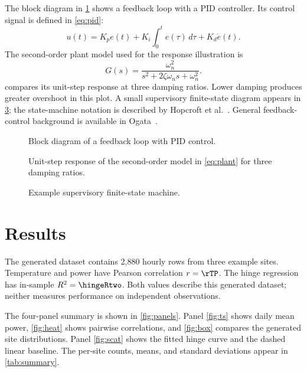 \documentclass[journal]{IEEEtran}
\begin{document}
The block diagram in \cref{fig:loop} shows a feedback loop with a PID controller. Its control signal is defined in \cref{eq:pid}:
\begin{equation}
  u(t)=K_pe(t)+K_i\int_0^t e(\tau)\,d\tau+K_d\dot e(t).
  \label{eq:pid}
\end{equation}
The second-order plant model used for the response illustration is
\begin{equation}
  G(s)=\frac{\omega_n^2}{s^2+2\zeta\omega_ns+\omega_n^2}.
  \label{eq:plant}
\end{equation}
 compares its unit-step response at three damping ratios. Lower damping produces greater overshoot in this plot. A small supervisory finite-state diagram appears in \cref{fig:fsm}; the state-machine notation is described by Hopcroft et al.~\cite{hopcroft2006automata}. General feedback-control background is available in Ogata~\cite{ogata2010modern}.

\begin{figure}[!tbp]
  \centering
  \resizebox{\columnwidth}{!}{}
  \caption{Block diagram of a feedback loop with PID control.}
  \label{fig:loop}
\end{figure}

\begin{figure}[!tbp]
  \centering
  
  \caption{Unit-step response of the second-order model in \cref{eq:plant} for three damping ratios.}
  \label{fig:step}
\end{figure}

\begin{figure}[!tbp]
  \centering
  \resizebox{0.95\columnwidth}{!}{}
  \caption{Example supervisory finite-state machine.}
  \label{fig:fsm}
\end{figure}

\section{Results}\label{sec:results}
The generated dataset contains 2,880 hourly rows from three example sites. Temperature and power have Pearson correlation $r=\rTP$. The hinge regression has in-sample $R^2=\hingeRtwo$. Both values describe this generated dataset; neither measures performance on independent observations.

The four-panel summary is shown in \cref{fig:panels}. Panel \cref{fig:ts} shows daily mean power, \cref{fig:heat} shows pairwise correlations, and \cref{fig:box} compares the generated site distributions. Panel \cref{fig:scat} shows the fitted hinge curve and the dashed linear baseline. The per-site counts, means, and standard deviations appear in \cref{tab:summary}.
\end{document}
